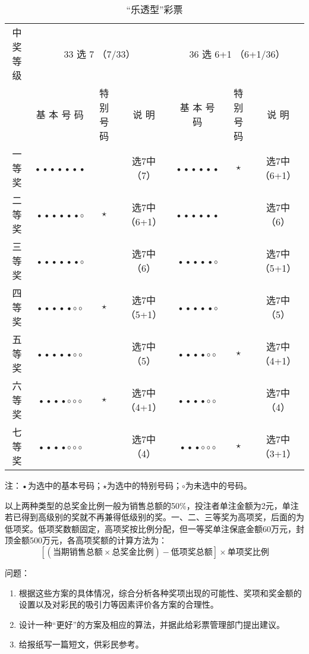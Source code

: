 	\begin{table}[H]\label{letou}
		\centering
		\caption{“乐透型”彩票}
		\begin{tabular}{|c|cc|c|cc|c|}
			\hline
			\multirowcell{2}{中 奖\\等 级} & \multicolumn{3}{c|}{33 选 7 （7/33）} & \multicolumn{3}{c|}{36 选 6+1 （6+1/36）} \\
			\cline{2-7}
			{} & 基 本 号 码 & 特别号码 & 说 明 & 基 本 号 码 & 特别号码 & 说 明 \\ \hline
			一等奖 & ••••••• & & 选7中（7） & •••••• & $\star$ & 选7中（6+1） \\ \hline
			二等奖 & ••••••$\circ$ & $\star$ & 选7中（6+1） & •••••• & & 选7中（6） \\ \hline
			三等奖 & ••••••$\circ$ & & 选7中（6） & •••••$\circ$ &  & 选7中（5+1） \\ \hline
			四等奖 & •••••$\circ\circ$ & $\star$ & 选7中（5+1） & •••••$\circ$ & & 选7中（5） \\ \hline
			五等奖 & •••••$\circ\circ$ & & 选7中（5） & ••••$\circ\circ$ & $\star$ & 选7中（4+1） \\ \hline
			六等奖 & ••••$\circ\circ\circ$ & $\star$ & 选7中（4+1） & ••••$\circ\circ$ & & 选7中（4） \\ \hline
			七等奖 & ••••$\circ\circ\circ$ & & 选7中（4） & •••$\circ\circ\circ$ & $\star$ & 选7中（3+1） \\ \hline
		\end{tabular}
	\end{table}
	注：•为选中的基本号码；$\star$为选中的特别号码；$\circ$为未选中的号码。
	
	以上两种类型的总奖金比例一般为销售总额的50\%，投注者单注金额为2元，单注若已得到高级别的奖就不再兼得低级别的奖。一、二、三等奖为高项奖，后面的为低项奖。低项奖数额固定，高项奖按比例分配，但一等奖单注保底金额60万元，封顶金额500万元，各高项奖额的计算方法为：\[
	[(\text{当期销售总额} \times \text{总奖金比例}) - \text{低项奖总额}] \times \text{单项奖比例}
	\]{
	\renewcommand{\labelenumi}{(\theenumi)}
	问题：
	\begin{enumerate}
		\item 根据这些方案的具体情况，综合分析各种奖项出现的可能性、奖项和奖金额的设置以及对彩民的吸引力等因素评价各方案的合理性。
		\item 设计一种“更好”的方案及相应的算法，并据此给彩票管理部门提出建议。
		\item 给报纸写一篇短文，供彩民参考。
	\end{enumerate}
	}
    
